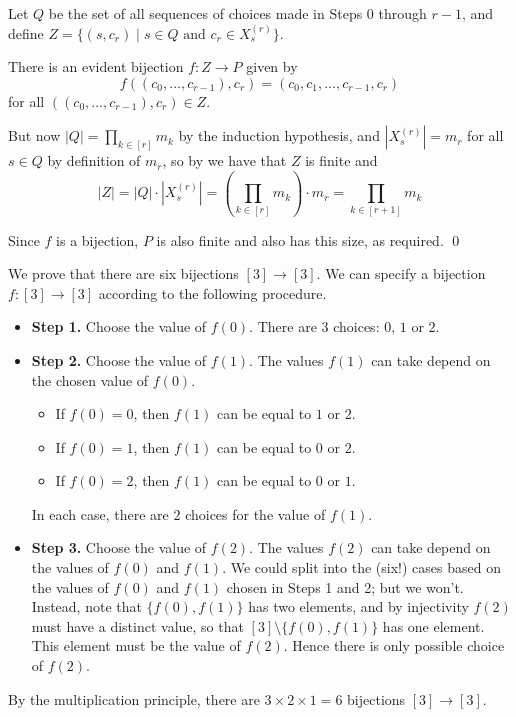 \begin{cproof}
\begin{itemize}
Let $Q$ be the set of all sequences of choices made in Steps $0$ through $r-1$, and define $Z = \{ (s,c_r) \mid s \in Q \text{ and } c_r \in X^{(r)}_s \}$.

There is an evident bijection $f : Z \to P$ given by
\[ f((c_0,\dots,c_{r-1}),c_r) = (c_0,c_1,\dots,c_{r-1},c_r) \]
for all $((c_0,\dots,c_{r-1}),c_r) \in Z$.

But now $|Q| = \displaystyle \prod_{k \in [r]} m_k$ by the induction hypothesis, and $|X^{(r)}_s| = m_r$ for all $s \in Q$ by definition of $m_r$, so by  we have that $Z$ is finite and
\[ |Z| = |Q| \cdot |X^{(r)}_s| = \left(\prod_{k \in [r]} m_k\right) \cdot m_r = \prod_{k \in [r+1]} m_k \]

Since $f$ is a bijection, $P$ is also finite and also has this size, as required. \qed
\end{itemize}
\end{cproof}

\begin{example}
We prove that there are six bijections $[3] \to [3]$. We can specify a bijection $f : [3] \to [3]$ according to the following procedure.
\begin{itemize}
\item \textbf{Step 1.} Choose the value of $f(0)$. There are $3$ choices: $0$, $1$ or $2$.
\item \textbf{Step 2.} Choose the value of $f(1)$. The values $f(1)$ can take depend on the chosen value of $f(0)$.
\begin{itemize}
\item If $f(0)=0$, then $f(1)$ can be equal to $1$ or $2$.
\item If $f(0)=1$, then $f(1)$ can be equal to $0$ or $2$.
\item If $f(0)=2$, then $f(1)$ can be equal to $0$ or $1$.
\end{itemize}
In each case, there are $2$ choices for the value of $f(1)$.
\item \textbf{Step 3.} Choose the value of $f(2)$. The values $f(2)$ can take depend on the values of $f(0)$ and $f(1)$. We could split into the (six!) cases based on the values of $f(0)$ and $f(1)$ chosen in Steps 1 and 2; but we won't. Instead, note that $\{f(0),f(1)\}$ has two elements, and by injectivity $f(2)$ must have a distinct value, so that $[3] \setminus \{ f(0),f(1) \}$ has one element. This element must be the value of $f(2)$. Hence there is only possible choice of $f(2)$.
\end{itemize}
By the multiplication principle, there are $3 \times 2 \times 1 = 6$ bijections $[3] \to [3]$.
\end{example}

